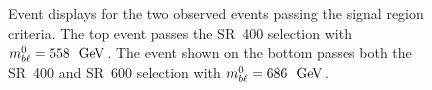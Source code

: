 \begin{figure}[ht]
  \centering
  \caption[
    Event displays for the two observed events passing the signal region
    criteria.
  ]{
    Event displays for the two observed events passing the signal region
    criteria.
    The top event passes the SR~400 selection with $\MBL^{0} = 558~\GeV$.
    The event shown on the bottom passes both the SR~400 and SR~600 selection
    with $\MBL^{0} = 686~\GeV$.
  }
  \label{fig:event_displays}
\end{figure}

